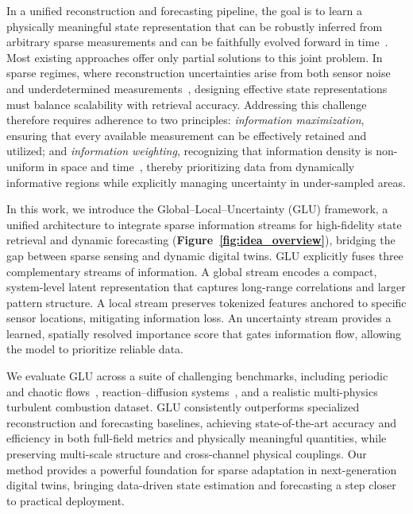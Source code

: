 \documentclass[pdflatex,sn-nature]{sn-jnl}%
\begin{document}
In a unified reconstruction and forecasting pipeline, the goal is to learn a physically meaningful state representation that can be robustly inferred from arbitrary sparse measurements and can be faithfully evolved forward in time~\cite{shen2022nerp, NEURIPS2022_cf70320e, cai2025causal}. 
Most existing approaches offer only partial solutions to this joint problem.
In sparse regimes, where reconstruction uncertainties arise from both sensor noise and underdetermined measurements~\cite{der2009aleatory}, designing effective state representations must balance scalability with retrieval accuracy.
Addressing this challenge therefore requires adherence to two principles: \textit{information maximization}, ensuring that every available measurement can be effectively retained and utilized; and \textit{information weighting}, recognizing that information density is non-uniform in space and time~\cite{zhong2024novel}, thereby prioritizing data from dynamically informative regions while explicitly managing uncertainty in under-sampled areas.

In this work, we introduce the Global–Local–Uncertainty (GLU) framework, a unified architecture to integrate sparse information streams for high-fidelity state retrieval and dynamic forecasting (\textbf{Figure~\ref{fig:idea_overview}}), bridging the gap between sparse sensing and dynamic digital twins.
GLU explicitly fuses three complementary streams of information. 
A global stream encodes a compact, system-level latent representation that captures long-range correlations and larger pattern structure. 
A local stream preserves tokenized features anchored to specific sensor locations, mitigating information loss. 
An uncertainty stream provides a learned, spatially resolved importance score that gates information flow, allowing the model to prioritize reliable data.

We evaluate GLU across a suite of challenging benchmarks, including periodic and chaotic flows~\cite{fukami2021global, SoleraRico2024}, reaction–diffusion systems~\cite{Rao2023Encoding}, and a realistic multi-physics turbulent combustion dataset. 
GLU consistently outperforms specialized reconstruction and forecasting baselines, achieving state-of-the-art accuracy and efficiency in both full-field metrics and physically meaningful quantities, while preserving multi-scale structure and cross-channel physical couplings. 
Our method provides a powerful foundation for sparse adaptation in next-generation digital twins, bringing data-driven state estimation and forecasting a step closer to practical deployment.
\end{document}
